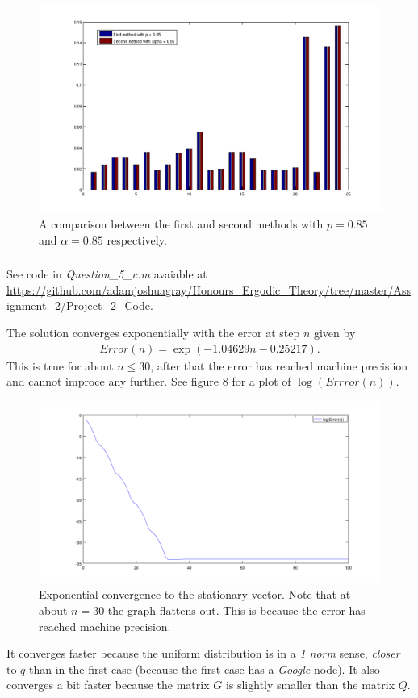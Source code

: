 \documentclass{unswmaths}
\begin{document}
\begin{figure}[h]
    \includegraphics[scale=0.4]{Comparison}
    \caption{A comparison between the first and second methods with $ p = 0.85 $ and $ \alpha = 0.85 $ respectively.}
\end{figure}


\subsubsection{}
See code in \emph{Question\_5\_c.m} avaiable at \url{https://github.com/adamjoshuagray/Honours_Ergodic_Theory/tree/master/Assignment_2/Project_2_Code}. 

The solution converges exponentially with the error at step $ n $ given by
\begin{align*}
    Error(n) = \exp(-1.04629n - 0.25217).
\end{align*}
This is true for about $ n \leq 30 $, after that the error has reached machine precisiion and cannot improce any further. See figure 8 for a plot of $ \log(Errror(n)) $.

\begin{figure}[h]
    \includegraphics[scale=0.5]{Log_Error_n_2}
    \caption{Exponential convergence to the stationary vector. Note that at about $n = 30 $ the graph flattens out. This is because the error has reached machine precision.}
\end{figure}
It converges faster because the uniform distribution is in a \emph{1 norm} sense, \emph{closer} to $ q $ than in the first case (because the first case has a \emph{Google} node). It also converges a bit faster because the matrix $ G $ is slightly smaller than the matrix $ Q $.
\end{document}
